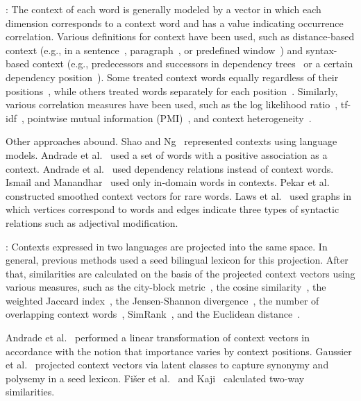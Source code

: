 \documentclass[english]{jnlp_1.4}
\begin{document}
: The context of each word is generally modeled by a vector in which each dimension corresponds to a context word and has a value indicating occurrence correlation. 
Various definitions for context have been used, such as distance-based context (e.g., in a sentence~\cite{laroche10}, paragraph~\cite{fung97}, or predefined window~\cite{rapp99,andrade10}) and syntax-based context (e.g., predecessors and successors in dependency trees~\cite{garera09} or a certain dependency position~\cite{otero08}). 
Some treated context words equally regardless of their positions~\cite{fung98}, while others treated words separately for each position~\cite{rapp99}. 
Similarly, various correlation measures have been used, such as the log likelihood ratio~\cite{rapp99,chiao02}, tf-idf~\cite{fung98}, pointwise mutual information (PMI)~\cite{andrade10}, and context heterogeneity~\cite{fung95}. 

Other approaches abound. Shao and Ng~\citeyear{shao04} represented contexts using language models. 
Andrade et al.~\citeyear{andrade10} used a set of words with a positive association as a context. 
Andrade et al.~\citeyear{andrade11:CIC} used dependency relations instead of context words. 
Ismail and Manandhar~\citeyear{ismail10} used only in-domain words in contexts. 
Pekar et al.~\citeyear{pekar06} constructed smoothed context vectors for rare words. 
Laws et al.~\citeyear{laws10} used graphs in which vertices correspond to words and edges indicate three types of syntactic relations such as adjectival modification. 

: Contexts expressed in two languages are projected into the same space. In general, previous methods used a seed bilingual lexicon for this projection. 
After that, similarities are calculated on the basis of the projected context vectors using various measures, such as the city-block metric~\cite{rapp99}, the cosine similarity~\cite{fung98}, the weighted Jaccard index~\cite{hazem11}, the Jensen-Shannon divergence~\cite{pekar06}, the number of overlapping context words~\cite{andrade10}, SimRank~\cite{laws10}, and the Euclidean distance~\cite{fung95}. 

Andrade et al.~\citeyear{andrade11} performed a linear transformation of context vectors in accordance with the notion that importance varies by context positions. 
Gaussier et al.~\citeyear{gaussier04} projected context vectors via latent classes to capture synonymy and polysemy in a seed lexicon. 
Fi{\v{s}}er et al.~\citeyear{fiser11} and Kaji~\citeyear{kaji05} calculated two-way similarities. 
\end{document}
